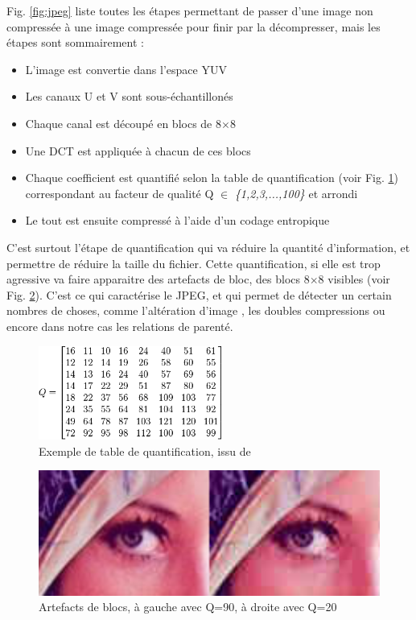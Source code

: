 \documentclass[utf8]{stageM2R} %
\begin{document}
Fig. \ref{fig:jpeg} liste toutes les étapes permettant de passer d'une image non compressée à une image compressée pour finir par la décompresser, mais les étapes sont sommairement : 

\begin{itemize}
  \item L'image est convertie dans l'espace YUV
  \item Les canaux U et V sont sous-échantillonés
  \item Chaque canal est découpé en blocs de 8$\times$8
  \item Une DCT est appliquée à chacun de ces blocs
  \item Chaque coefficient est quantifié selon la table de quantification (voir Fig. \ref{fig:quantization_table}) correspondant au facteur de qualité Q $\in$ \textit{\{1,2,3,...,100\}} et arrondi
  \item Le tout est ensuite compressé à l'aide d'un codage entropique
\end{itemize}

C'est surtout l'étape de quantification qui va réduire la quantité d'information, et permettre de réduire la taille du fichier. Cette quantification, si elle est trop agressive va faire apparaitre des artefacts de bloc, des blocs 8$\times$8 visibles (voir Fig. \ref{fig:blocs_artefacts}). C'est ce qui caractérise le JPEG, et qui permet de détecter un certain nombres de choses, comme l'altération d'image \cite{bianchi2012image}, les doubles compressions \cite{bianchi2012detection} ou encore dans notre cas les relations de parenté.

\begin{figure}[H]
  \begin{center}
    \includegraphics[width=60mm]{images/quantization_table.png}
    \caption{Exemple de table de quantification, issu de \cite{jpeg}}
    \label{fig:quantization_table}
  \end{center}
\end{figure}

\begin{figure}[H]
  \begin{center}
    \includegraphics[width=120mm]{images/eyes.png}
    \caption{Artefacts de blocs, à gauche avec Q=90, à droite avec Q=20}
    \label{fig:blocs_artefacts}
  \end{center}
\end{figure}
\end{document}
